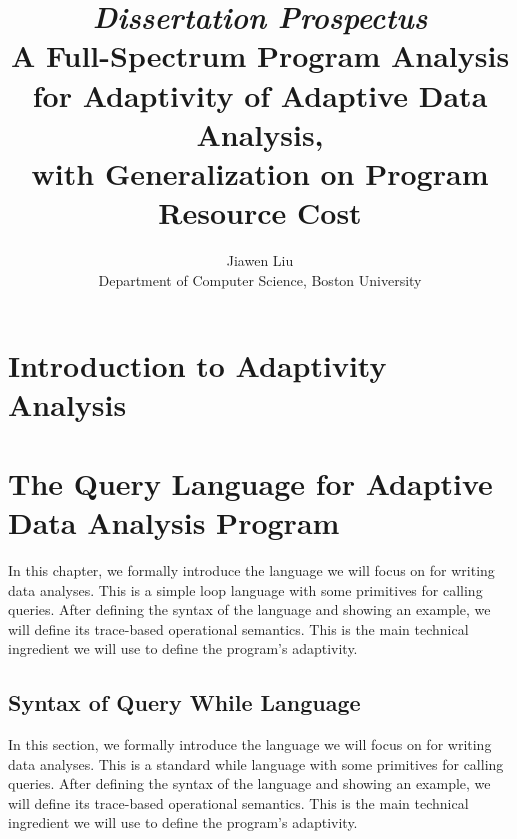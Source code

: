 \documentclass[a4paper,11pt]{article}
\begin{document}
\title{{\em Dissertation Prospectus}
\\  A Full-Spectrum Program Analysis for Adaptivity of Adaptive Data Analysis, 
\\ with Generalization on Program Resource Cost}

\author{Jiawen Liu\\ Department of Computer Science, Boston University}
\maketitle
\begin{abstract}

  
\end{abstract}
\tableofcontents{}

\section{Introduction to Adaptivity Analysis}
\label{sec:introduction}
% 
\cleardoublepage



\section{The Query Language for Adaptive Data Analysis Program}
\label{sec:language}
In this chapter, we formally introduce the language we will focus on for writing data analyses.  
This is a simple loop language with some primitives for calling queries. 
After defining the syntax of the language and showing an example, we will define its trace-based operational semantics. 
This is the main technical ingredient we will use to define the program's adaptivity.

\subsection{Syntax of Query While Language}
\label{sec:language-syntax}
In this section, we formally introduce the language we will focus on for writing data analyses.  This is a standard while language with some primitives for calling queries. After defining the syntax of the language and showing an example, we will define its trace-based operational semantics. This is the main technical ingredient we will use to define the program's adaptivity.
\end{document}
